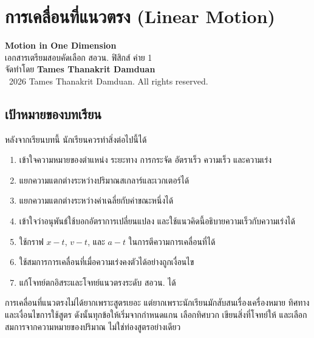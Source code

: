 
\chapter{การเคลื่อนที่แนวตรง (Linear Motion)}

\begin{center}
    {\Large \textbf{Motion in One Dimension}}\\[4pt]
    {\normalsize เอกสารเตรียมสอบคัดเลือก สอวน. ฟิสิกส์ ค่าย 1}\\[6pt]
    {\normalsize จัดทำโดย \textbf{Tames Thanakrit Damduan}}\\[2pt]
    {\footnotesize \textcopyright\ 2026 Tames Thanakrit Damduan. All rights reserved.}\\[8pt]
\end{center}

\section*{เป้าหมายของบทเรียน}

หลังจากเรียนบทนี้ นักเรียนควรทำสิ่งต่อไปนี้ได้

\begin{enumerate}
    \item เข้าใจความหมายของตำแหน่ง ระยะทาง การกระจัด อัตราเร็ว ความเร็ว และความเร่ง
    \item แยกความแตกต่างระหว่างปริมาณสเกลาร์และเวกเตอร์ได้
    \item แยกความแตกต่างระหว่างค่าเฉลี่ยกับค่าขณะหนึ่งได้
    \item เข้าใจว่าอนุพันธ์ใช้บอกอัตราการเปลี่ยนแปลง และใช้แนวคิดนี้อธิบายความเร็วกับความเร่งได้
    \item ใช้กราฟ $x-t$, $v-t$, และ $a-t$ ในการตีความการเคลื่อนที่ได้
    \item ใช้สมการการเคลื่อนที่เมื่อความเร่งคงตัวได้อย่างถูกเงื่อนไข
    \item แก้โจทย์ตกอิสระและโจทย์แนวตรงระดับ สอวน. ได้
\end{enumerate}

\begin{tcolorbox}[title=แนวคิดสำคัญของบทนี้]
การเคลื่อนที่แนวตรงไม่ได้ยากเพราะสูตรเยอะ แต่ยากเพราะนักเรียนมักสับสนเรื่องเครื่องหมาย ทิศทาง และเงื่อนไขการใช้สูตร ดังนั้นทุกข้อให้เริ่มจากกำหนดแกน เลือกทิศบวก เขียนสิ่งที่โจทย์ให้ และเลือกสมการจากความหมายของปริมาณ ไม่ใช่ท่องสูตรอย่างเดียว
\end{tcolorbox}

